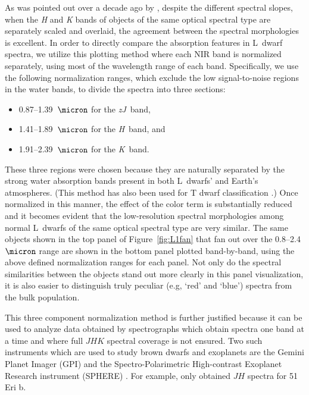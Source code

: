 \documentclass[modern]{aastex61}
\begin{document}
As was pointed out over a decade ago by \citet{Leggett:2003tm}, despite the different spectral slopes, when the \emph{H} and \emph{K} bands of objects of the same optical spectral type are separately scaled and overlaid, the agreement between the spectral morphologies is excellent.
In order to directly compare the absorption features in L~dwarf spectra, we utilize this plotting method where each NIR band is normalized separately, using most of the wavelength range of each band.
Specifically, we use the following normalization ranges, which exclude the low signal-to-noise regions in the water bands, to divide the spectra into three sections:
\begin{itemize}
\item 0.87--1.39~$\micron$ for the \emph{zJ}~band,
\item 1.41--1.89~$\micron$ for the \emph{H}~band, and
\item 1.91--2.39~$\micron$ for the \emph{K}~band.
\end{itemize}
These three regions were chosen because they are naturally separated by the strong water absorption bands present in both L~dwarfs' and Earth's atmospheres.
(This method has also been used for T dwarf classification \citep{Burgasser06}.)
Once normalized in this manner, the effect of the color term is substantially reduced and it becomes evident that the low-resolution spectral morphologies among normal L~dwarfs of the same optical spectral type are very similar.
The same objects shown in the top panel of Figure~\ref{fig:L1fan} that fan out over the 0.8--2.4~$\micron$ range are shown in the bottom panel plotted band-by-band, using the above defined normalization ranges for each panel.
Not only do the spectral similarities between the objects stand out more clearly in this panel visualization, it is also easier to distinguish truly peculiar (e.g, `red' and `blue') spectra from the bulk population.

This three component normalization method is further justified because it can be used to analyze data obtained by spectrographs which obtain spectra one band at a time and where full $JHK$ spectral coverage is not ensured.
Two such instruments which are used to study brown dwarfs and exoplanets are the Gemini Planet Imager (GPI) and the Spectro-Polarimetric High-contrast Exoplanet Research instrument (SPHERE) \citep{Beuzit:2008gt,Macintosh:2014js}.
For example, \citet{Macintosh:2015ew} only obtained $JH$ spectra for 51 Eri b.
\end{document}
